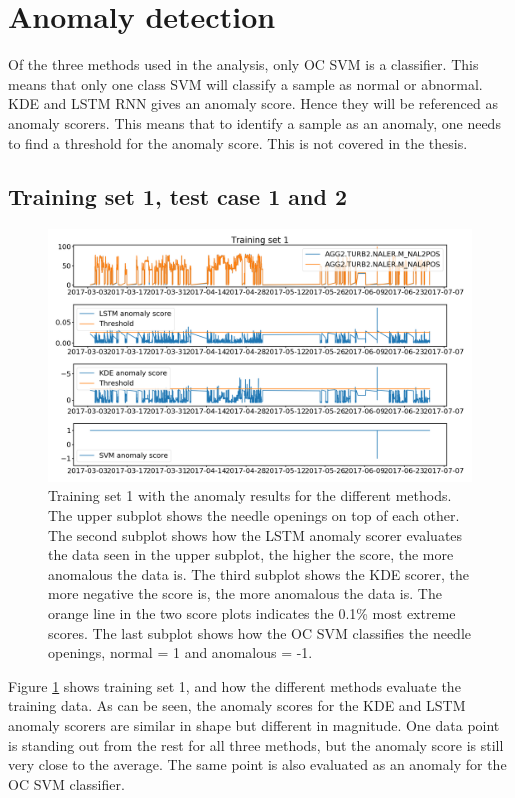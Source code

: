     \section{Anomaly detection}
        Of the three methods used in the analysis, only OC SVM is a classifier. This means that only one class SVM will classify a sample as normal or abnormal. KDE and LSTM RNN gives an anomaly score. Hence they will be referenced as anomaly scorers. This means that to identify a sample as an anomaly, one needs to find a threshold for the anomaly score. This is not covered in the thesis.
        
    \subsection{Training set 1, test case 1 and 2}
        \begin{figure}
            \centering
            \includegraphics[width=\textwidth]{report/figures/analysis/plant1_training/training_data_anomaly.png}
            \caption{Training set 1 with the anomaly results for the different methods. The upper subplot shows the needle openings on top of each other. The second subplot shows how the LSTM anomaly scorer evaluates the data seen in the upper subplot, the higher the score, the more anomalous the data is. The third subplot shows the KDE scorer, the more negative the score is, the more anomalous the data is. The orange line in the two score plots indicates the 0.1\% most extreme scores. The last subplot shows how the OC SVM classifies the needle openings, normal = 1 and anomalous = -1.}
            \label{fig:anomaly_training_set1}
        \end{figure}
        Figure \ref{fig:anomaly_training_set1} shows training set 1, and how the different methods evaluate the training data. As can be seen, the anomaly scores for the KDE and LSTM anomaly scorers are similar in shape but different in magnitude. One data point is standing out from the rest for all three methods, but the anomaly score is still very close to the average. The same point is also evaluated as an anomaly for the OC SVM classifier.
        
